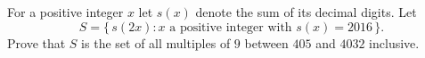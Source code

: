 For a positive integer $x$ let $s(x)$ denote the sum of its decimal digits. Let
\[
S=\{\,s(2x) : x \text{ a positive integer with } s(x)=2016\,\}.
\]
Prove that $S$ is the set of all multiples of $9$ between $405$ and $4032$ inclusive.
